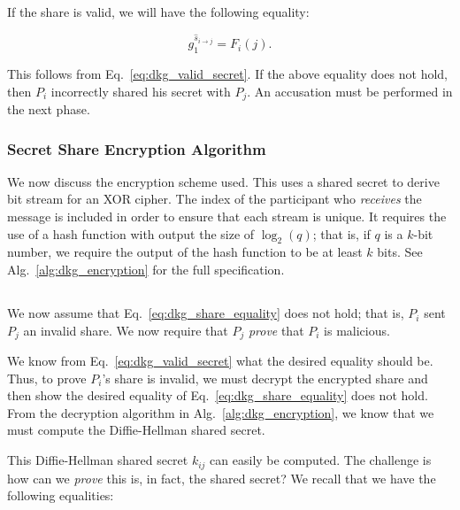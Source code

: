 \noindent
If the share is valid, we will have the following equality:

\begin{equation}
    g_{1}^{\hat{s}_{i\to j}} = F_{i}(j).
    \label{eq:dkg_share_equality}
\end{equation}

\noindent
This follows from Eq.~\eqref{eq:dkg_valid_secret}.
If the above equality does not hold,
then $P_{i}$ incorrectly shared his secret with $P_{j}$.
An accusation must be performed in the next phase.

\subsubsection{Secret Share Encryption Algorithm}
\label{sssec:secret_dkg_share_encryption}

We now discuss the \gls{encryption scheme} used.
This uses a \gls{shared secret} to derive bit stream
for an XOR cipher.
The index of the participant who \emph{receives} the message is included
in order to ensure that each stream is unique.
It requires the use of a \gls{hash function} with output the size
of $\log_{2}(q)$;
that is, if $q$ is a $k$-bit number, we require the output
of the \gls{hash function} to be at least $k$ bits.
See Alg.~\ref{alg:dkg_encryption} for the full specification.




\subsection{\ShareDispute{}}
\label{ssec:secret_dkg_share_dispute}

We now assume that Eq.~\eqref{eq:dkg_share_equality} does not hold;
that is, $P_{i}$ sent $P_{j}$ an invalid share.
We now require that $P_{j}$ \emph{prove} that $P_{i}$ is malicious.

We know from Eq.~\eqref{eq:dkg_valid_secret} what the desired
equality should be.
Thus, to prove $P_{i}$'s share is invalid,
we must decrypt the encrypted share and then show the desired equality
of Eq.~\eqref{eq:dkg_share_equality} does not hold.
From the decryption algorithm in Alg.~\ref{alg:dkg_encryption},
we know that we must compute the Diffie-Hellman shared secret.

This Diffie-Hellman shared secret $k_{ij}$ can easily be computed.
The challenge is how can we \emph{prove} this is,
in fact, the shared secret?
We recall that we have the following equalities:

